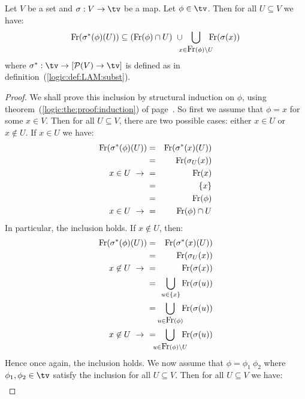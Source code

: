 \begin{prop}\label{logic:prop:LAM:freevar:of:betasubst:gen}
Let $V$ be a set and $\sigma:V\to\tv$ be a map. Let $\phi\in\tv$.
Then for all $U\subseteq V$ we have:
    \[
        \free(\sigma^{*}(\phi)(U)) 
            \subseteq 
        (\free(\phi)\cap U)\ \ \ 
            \!\!\!\!\cup\!\!\!\!
        \bigcup_{x\in\free(\phi)\setminus U}\!\!\!\! \free(\sigma(x))
    \]
where $\sigma^{*}:\tv\to[{\cal P}(V)\to\tv]$ is defined as in 
definition~(\ref{logic:def:LAM:subst}).
\end{prop}
\begin{proof}
We shall prove this inclusion by structural induction on $\phi$, using
theorem~(\ref{logic:the:proof:induction}) of 
page~\pageref{logic:the:proof:induction}. So first we assume that $\phi=x$ 
for some $x\in V$. Then for all $U\subseteq V$, there are two possible cases: 
either $x\in U$ or $x\not\in U$. If $x\in U$ we have:
    \begin{eqnarray*}
        \mbox{\rm Fr}(\sigma^{*}(\phi)(U))
        &=&\mbox{\rm Fr}(\sigma^{*}(x)(U))\\
        &=&\mbox{\rm Fr}(\sigma_{U}(x))\\
        \mbox{$x\in U\ \rightarrow\ $}&=&\mbox{\rm Fr}(x)\\
         &=&\{x\}\\
         &=&\mbox{\rm Fr}(\phi)\\
        \mbox{$x\in U\ \rightarrow\ $}&=&\mbox{\rm Fr}(\phi)\cap U
    \end{eqnarray*}
In particular, the inclusion holds. If $x\not\in U$, then:
     \begin{eqnarray*}
        \free(\sigma^{*}(\phi)(U))
        &=&\free(\sigma^{*}(x)(U))\\
        &=&\free(\sigma_{U}(x))\\
        \mbox{$x\not\in U\ \rightarrow\ $}&=&\free(\sigma(x))\\
        &=&\!\!\!\bigcup_{u\in\{x\}} \free(\sigma(u))\\
        &=&\!\!\!\!\!\bigcup_{u\in\free(\phi)}\!\! \free(\sigma(u))\\
        \mbox{$x\not\in U\ \rightarrow\ $}
        &=&\!\!\!\!\!\!\!\!\bigcup_{u\in\free(\phi)\setminus U}\!\!\!\!\!
            \free(\sigma(u))
    \end{eqnarray*}
Hence once again, the inclusion holds. We now assume that 
$\phi=\phi_{1}\ \phi_{2}$ where $\phi_{1}, \phi_{2}\in\tv$ satisfy the 
inclusion for all $U\subseteq V$. Then for all $U\subseteq V$ we have:
    \begin{eqnarray*}

\end{eqnarray*}
\end{proof}
